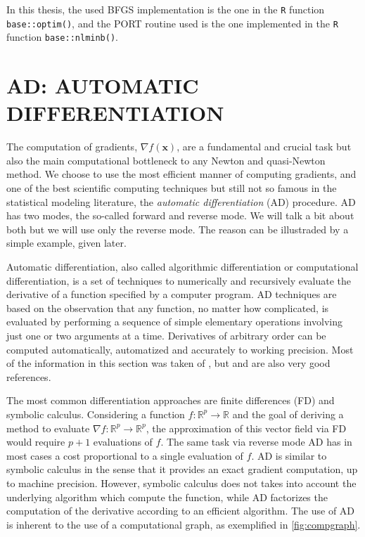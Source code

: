 In this thesis, the used BFGS implementation is the one in the
\texttt{R} \cite{R21} function \texttt{base::optim()}, and the PORT
routine used is the one implemented in the \texttt{R} function
\texttt{base::nlminb()}.

\section{AD: AUTOMATIC DIFFERENTIATION}
\label{cap:ad}

The computation of gradients, \(\nabla f(\bm{x})\), are a fundamental
and crucial task but also the main computational bottleneck to any
Newton and quasi-Newton method. We choose to use the most efficient
manner of computing gradients, and one of the best scientific computing
techniques but still not so famous in the statistical modeling
literature, the \textit{automatic differentiation} (AD) procedure. AD
has two modes, the so-called forward and reverse mode. We will talk a
bit about both but we will use only the reverse mode. The reason can be
illustraded by a simple example, given later.

Automatic differentiation, also called algorithmic differentiation or
computational differentiation, is a set of techniques to numerically and
recursively evaluate the derivative of a function specified by a
computer program. AD techniques are based on the observation that any
function, no matter how complicated, is evaluated by performing a
sequence of simple elementary operations involving just one or two
arguments at a time. Derivatives of arbitrary order can be computed
automatically, automatized and accurately to working precision. Most of
the information in this section was taken of , but
 and 
are also very good references.

The most common differentiation approaches are finite differences (FD)
and symbolic calculus. Considering a function \(f: \mathbb{R}^{p}
\rightarrow \mathbb{R}\) and the goal of deriving a method to evaluate
\(\nabla f: \mathbb{R}^{p} \rightarrow \mathbb{R}^{p}\), the
approximation of this vector field via FD would require \(p + 1\)
evaluations of \(f\). The same task via reverse mode AD has in most
cases a cost proportional to a single evaluation of \(f\). AD is similar
to symbolic calculus in the sense that it provides an exact gradient
computation, up to machine precision. However, symbolic calculus does
not takes into account the underlying algorithm which compute the
function, while AD factorizes the computation of the derivative
according to an efficient algorithm. The use of AD is inherent to the
use of a computational graph, as exemplified in \autoref{fig:compgraph}.

